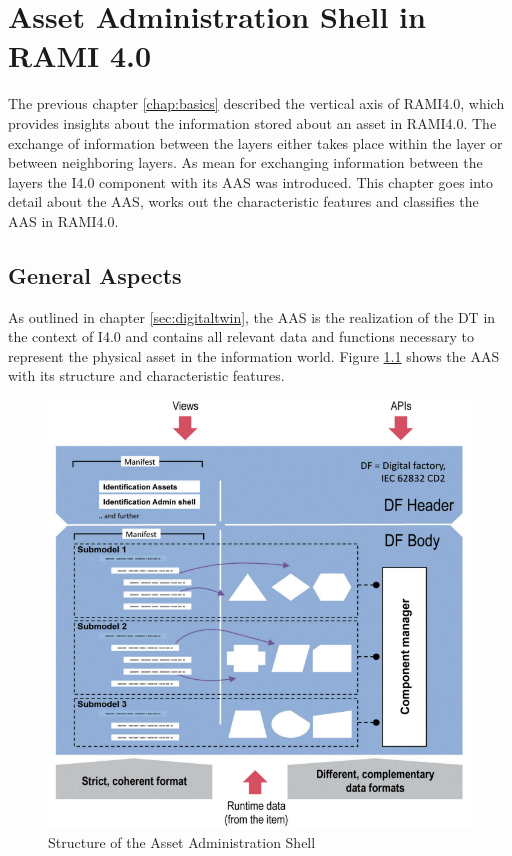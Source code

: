 \chapter{Asset Administration Shell in RAMI 4.0} \label{chap:aas-and-rami}
The previous chapter \ref{chap:basics} described the vertical axis of \ac{RAMI4.0}, which provides insights about the information stored about an asset in \ac{RAMI4.0}. The exchange of information between the layers either takes place within the layer or between neighboring layers. As mean for exchanging information between the layers the \ac{I4.0} component with its \ac{AAS} was introduced. This chapter goes into detail about the \ac{AAS}, works out the characteristic features and classifies the \ac{AAS} in \ac{RAMI4.0}.


\section{General Aspects} \label{sec:assetadministrationshell}
As outlined in chapter \ref{sec:digitaltwin}, the \ac{AAS} is the realization of the \ac{DT} in the context of \ac{I4.0} and contains all relevant data and functions necessary to represent the physical asset in the information world. Figure \ref{fig:structureaas} shows the \ac{AAS} with its structure and characteristic features.

\begin{figure}[h]
\centering
\includegraphics[scale=0.8]{content/pictures/structure_aas_zvei.png}
\caption{Structure of the Asset Administration Shell}
\label{fig:structureaas}
\end{figure}

